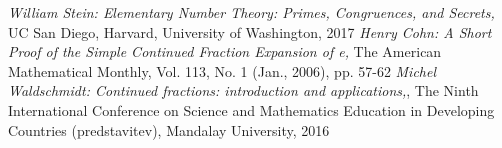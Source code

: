 \documentclass[a4paper,12pt]{article}
\theoremstyle{definition}
\theoremstyle{proposition}
\theoremstyle{theorem}
\theoremstyle{lemma}
\begin{document}
\begin{thebibliography}{5}
\textit{William Stein: Elementary Number Theory:
Primes, Congruences, and Secrets,} UC San Diego, Harvard, University of Washington, 2017
\textit{Henry Cohn: A Short Proof of the Simple Continued Fraction Expansion of e,} The American Mathematical Monthly, Vol. 113, No. 1 (Jan., 2006), pp. 57-62
\textit{Michel Waldschmidt: Continued fractions:
introduction and applications,}, The Ninth International Conference on
Science and Mathematics Education in Developing Countries (predstavitev), Mandalay University, 2016
\end{thebibliography}
\end{document}
